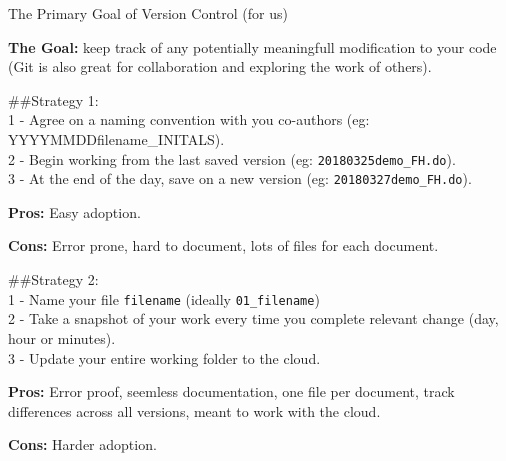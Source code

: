 \documentclass[ignorenonframetext,]{beamer}
\begin{document}
\begin{frame}[fragile]{The Primary Goal of Version Control (for us)}
\protect\hypertarget{the-primary-goal-of-version-control-for-us}{}

\textbf{The Goal:} keep track of any potentially meaningfull
modification to your code (Git is also great for collaboration and
exploring the work of others).

\#\#Strategy 1:\\
1 - Agree on a naming convention with you co-authors (eg:
YYYYMMDDfilename\_INITALS).\\
2 - Begin working from the last saved version (eg:
\texttt{20180325demo\_FH.do}).\\
3 - At the end of the day, save on a new version (eg:
\texttt{20180327demo\_FH.do}).

\textbf{Pros:} Easy adoption.

\textbf{Cons:} Error prone, hard to document, lots of files for each
document.

\#\#Strategy 2:\\
1 - Name your file \texttt{filename} (ideally \texttt{01\_filename})\\
2 - Take a snapshot of your work every time you complete relevant change
(day, hour or minutes).\\
3 - Update your entire working folder to the cloud.

\textbf{Pros:} Error proof, seemless documentation, one file per
document, track differences across all versions, meant to work with the
cloud.

\textbf{Cons:} Harder adoption.

\end{frame}
\end{document}
